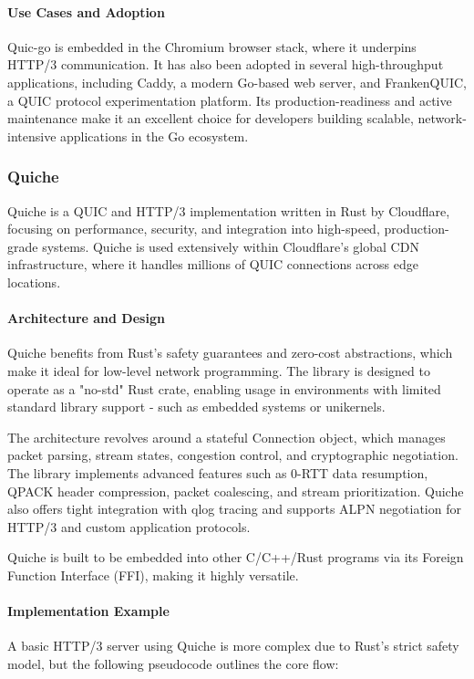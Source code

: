 \paragraph{Use Cases and Adoption}
Quic-go is embedded in the Chromium browser stack, where it underpins HTTP/3 communication. It has also been adopted in several high-throughput applications, including Caddy, a modern Go-based web server, and FrankenQUIC, a QUIC protocol experimentation platform. Its production-readiness and active maintenance make it an excellent choice for developers building scalable, network-intensive applications in the Go ecosystem.

\subsubsection{Quiche}
Quiche is a QUIC and HTTP/3 implementation written in Rust by Cloudflare, focusing on performance, security, and integration into high-speed, production-grade systems. Quiche is used extensively within Cloudflare's global CDN infrastructure, where it handles millions of QUIC connections across edge locations.

\paragraph{Architecture and Design}
Quiche benefits from Rust's safety guarantees and zero-cost abstractions, which make it ideal for low-level network programming. The library is designed to operate as a "no-std" Rust crate, enabling usage in environments with limited standard library support - such as embedded systems or unikernels.

The architecture revolves around a stateful Connection object, which manages packet parsing, stream states, congestion control, and cryptographic negotiation. The library implements advanced features such as 0-RTT data resumption, QPACK header compression, packet coalescing, and stream prioritization. Quiche also offers tight integration with qlog tracing and supports ALPN negotiation for HTTP/3 and custom application protocols.

Quiche is built to be embedded into other C/C++/Rust programs via its Foreign Function Interface (FFI), making it highly versatile.

\paragraph{Implementation Example}
A basic HTTP/3 server using Quiche is more complex due to Rust's strict safety model, but the following pseudocode outlines the core flow:

